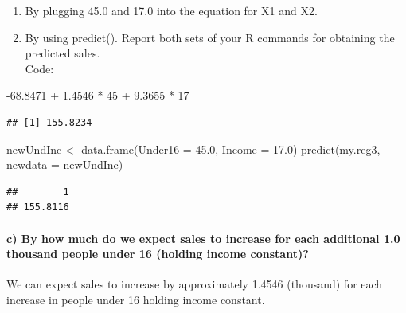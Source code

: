 \documentclass[
]{article}
\newenvironment{Shaded}{\begin{snugshade}}{\end{snugshade}}
\newcommand{\AttributeTok}[1]{\textcolor[rgb]{0.77,0.63,0.00}{#1}}
\newcommand{\DecValTok}[1]{\textcolor[rgb]{0.00,0.00,0.81}{#1}}
\newcommand{\FloatTok}[1]{\textcolor[rgb]{0.00,0.00,0.81}{#1}}
\newcommand{\FunctionTok}[1]{\textcolor[rgb]{0.00,0.00,0.00}{#1}}
\newcommand{\NormalTok}[1]{#1}
\newcommand{\OtherTok}[1]{\textcolor[rgb]{0.56,0.35,0.01}{#1}}
\newcommand{\SpecialCharTok}[1]{\textcolor[rgb]{0.00,0.00,0.00}{#1}}
\providecommand{\tightlist}{%
  \setlength{\itemsep}{0pt}\setlength{\parskip}{0pt}}
\begin{document}
\begin{enumerate}
\def\labelenumi{\arabic{enumi}.}
\tightlist
\item
  By plugging 45.0 and 17.0 into the equation for X1 and X2.
\item
  By using predict(). Report both sets of your R commands for obtaining
  the predicted sales.\\
  Code:
\end{enumerate}

\begin{Shaded}
\begin{Highlighting}[]
\SpecialCharTok{{-}}\FloatTok{68.8471} \SpecialCharTok{+} \FloatTok{1.4546} \SpecialCharTok{*} \DecValTok{45} \SpecialCharTok{+} \FloatTok{9.3655} \SpecialCharTok{*} \DecValTok{17}
\end{Highlighting}
\end{Shaded}

\begin{verbatim}
## [1] 155.8234
\end{verbatim}

\begin{Shaded}
\begin{Highlighting}[]
\NormalTok{newUndInc }\OtherTok{\textless{}{-}} \FunctionTok{data.frame}\NormalTok{(}\AttributeTok{Under16 =} \FloatTok{45.0}\NormalTok{, }\AttributeTok{Income =} \FloatTok{17.0}\NormalTok{)}
\FunctionTok{predict}\NormalTok{(my.reg3, }\AttributeTok{newdata =}\NormalTok{ newUndInc)}
\end{Highlighting}
\end{Shaded}

\begin{verbatim}
##        1 
## 155.8116
\end{verbatim}

\hypertarget{c-by-how-much-do-we-expect-sales-to-increase-for-each-additional-1.0-thousand-people-under-16-holding-income-constant}{%
\paragraph{c) By how much do we expect sales to increase for each
additional 1.0 thousand people under 16 (holding income
constant)?}\label{c-by-how-much-do-we-expect-sales-to-increase-for-each-additional-1.0-thousand-people-under-16-holding-income-constant}}

\hfill\break
We can expect sales to increase by approximately 1.4546 (thousand) for
each increase in people under 16 holding income constant.
\end{document}
